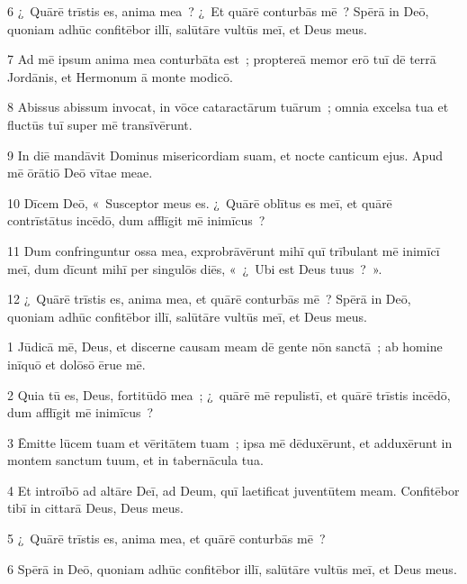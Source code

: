 \psalmVerse
  {\phantom{00}6}
  {¿~Quārē trīstis es, anima mea~? ¿~Et quārē conturbās mē~? Spērā in Deō, quoniam adhūc confitēbor illī, salūtāre vultūs meī, et Deus meus.}


\psalmVerse
  {\phantom{00}7}
  {Ad mē ipsum anima mea conturbāta est~; proptereā memor erō tuī dē terrā Jordānis, et Hermonum ā monte modicō.}


\psalmVerse
  {\phantom{00}8}
  {Abissus abissum invocat, in vōce cataractārum tuārum~; omnia excelsa tua et fluctūs tuī super mē transīvērunt.}


\psalmVerse
  {\phantom{00}9}
  {In diē mandāvit Dominus misericordiam suam, et nocte canticum ejus. Apud mē ōrātiō Deō vītae meae.}


\psalmVerse
  {\phantom{0}10}
  {Dīcem Deō, «~Susceptor meus es. ¿~Quārē oblītus es meī, et quārē contrīstātus incēdō, dum afflīgit mē inimīcus~?}


\psalmVerse
  {\phantom{0}11}
  {Dum confringuntur ossa mea, exprobrāvērunt mihī quī trībulant mē inimīcī meī, dum dīcunt mihī per singulōs diēs, «~¿~Ubi est Deus tuus~?~».}


\psalmVerse
  {\phantom{0}12}
  {¿~Quārē trīstis es, anima mea, et quārē conturbās mē~? Spērā in Deō, quoniam adhūc confitēbor illī, salūtāre vultūs meī, et Deus meus.}



\psalmVerse
  {\phantom{00}1}
  {Jūdicā mē, Deus, et discerne causam meam dē gente nōn sanctā~; ab homine inīquō et dolōsō ērue mē.}


\psalmVerse
  {\phantom{00}2}
  {Quia tū es, Deus, fortitūdō mea~; ¿~quārē mē repulistī, et quārē trīstis incēdō, dum afflīgit mē inimīcus~?}


\psalmVerse
  {\phantom{00}3}
  {Ēmitte lūcem tuam et vēritātem tuam~; ipsa mē dēduxērunt, et adduxērunt in montem sanctum tuum, et in tabernācula tua.}


\psalmVerse
  {\phantom{00}4}
  {Et introībō ad altāre Deī, ad Deum, quī laetificat juventūtem meam. Confitēbor tibī in cittarā Deus, Deus meus.}


\psalmVerse
  {\phantom{00}5}
  {¿~Quārē trīstis es, anima mea, et quārē conturbās mē~?}


\psalmVerse
  {\phantom{00}6}
  {Spērā in Deō, quoniam adhūc confitēbor illī, salūtāre vultūs meī, et Deus meus.}




